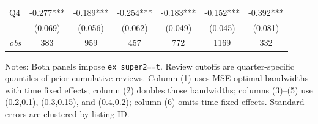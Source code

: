 \begin{table}[!htbp]
\begin{tabular}{lcccccc}
Q4 & -0.277*** & -0.189*** & -0.254*** & -0.183*** & -0.152*** & -0.392*** \\
 & (0.069) & (0.056) & (0.062) & (0.049) & (0.045) & (0.081) \\
\textit{obs} & 383 & 959 & 457 & 772 & 1169 & 332 \\
\bottomrule
\end{tabular}
\begin{minipage}{0.98\textwidth}\footnotesize
Notes: Both panels impose \texttt{ex\_super2==t}. Review cutoffs are quarter-specific quantiles of prior cumulative reviews. Column (1) uses MSE-optimal bandwidths with time fixed effects; column (2) doubles those bandwidths; columns (3)--(5) use (0.2,0.1), (0.3,0.15), and (0.4,0.2); column (6) omits time fixed effects. Standard errors are clustered by listing ID.
\end{minipage}
\end{table}

